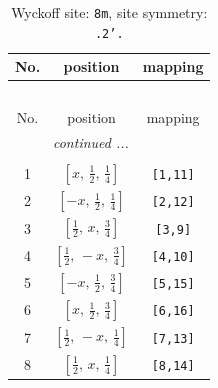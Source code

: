 \documentclass[fleqn,8pt]{jsarticle}
\begin{document}
\begin{longtable}{ccc}
\caption{Wyckoff site: {\tt 8m}, site symmetry: {\tt .2'.}}
 \\
 \hline \hline
No. & position & mapping \\ \hline \endfirsthead

\multicolumn{2}{l}{\tablename\ \thetable{}} \\
 \hline \hline
No. & position & mapping \\ \hline \endhead

 \hline \hline
\multicolumn{2}{r}{\footnotesize\it continued ...} \\ \endfoot

 \hline \hline
\multicolumn{2}{r}{} \\ \endlastfoot

1 & $\left[ x,\, \frac{1}{2},\, \frac{1}{4} \right]$ & {\tt [1,11]} \\ \hline
2 & $\left[ - x,\, \frac{1}{2},\, \frac{1}{4} \right]$ & {\tt [2,12]} \\ \hline
3 & $\left[ \frac{1}{2},\, x,\, \frac{3}{4} \right]$ & {\tt [3,9]} \\ \hline
4 & $\left[ \frac{1}{2},\, - x,\, \frac{3}{4} \right]$ & {\tt [4,10]} \\ \hline
5 & $\left[ - x,\, \frac{1}{2},\, \frac{3}{4} \right]$ & {\tt [5,15]} \\ \hline
6 & $\left[ x,\, \frac{1}{2},\, \frac{3}{4} \right]$ & {\tt [6,16]} \\ \hline
7 & $\left[ \frac{1}{2},\, - x,\, \frac{1}{4} \right]$ & {\tt [7,13]} \\ \hline
8 & $\left[ \frac{1}{2},\, x,\, \frac{1}{4} \right]$ & {\tt [8,14]} \\
\end{longtable}
\renewcommand{\arraystretch}{1.2}
\end{document}
